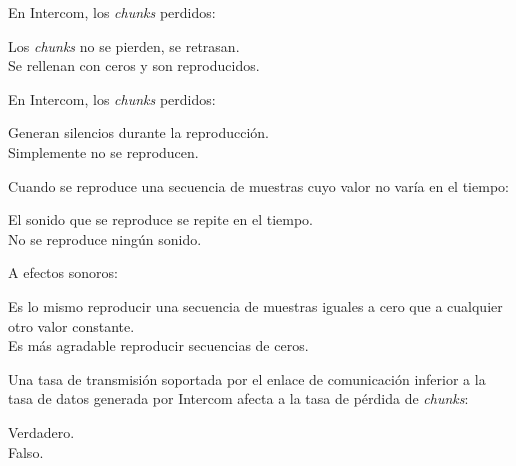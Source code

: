 \documentclass[legalpaper, 12pt, addpoints]{exam}
\begin{document}
\begin{questions}

\question En Intercom, los \emph{chunks} perdidos:

\begin{oneparchoices}
  \choice Los \emph{chunks} no se pierden, se retrasan.\\
  \choice Se rellenan con ceros y son reproducidos.
\end{oneparchoices}
  
\vspace{0.10in}

\question En Intercom, los \emph{chunks} perdidos:

\begin{oneparchoices}
  \choice Generan silencios durante la reproducción.\\
  \choice Simplemente no se reproducen.
\end{oneparchoices}
  
\vspace{0.10in}

\question Cuando se reproduce una secuencia de muestras cuyo valor no varía en el tiempo:

\begin{oneparchoices}
  \choice El sonido que se reproduce se repite en el tiempo.\\
  \choice No se reproduce ningún sonido.
\end{oneparchoices}
  
\vspace{0.10in}

\question A efectos sonoros:

\begin{oneparchoices}
  \choice Es lo mismo reproducir una secuencia de muestras iguales a cero que a cualquier otro valor constante.\\
  \choice Es más agradable reproducir secuencias de ceros.
\end{oneparchoices}
  
\vspace{0.10in}

\question Una tasa de transmisión soportada por el enlace de
comunicación inferior a la tasa de datos generada por Intercom afecta
a la tasa de pérdida de \emph{chunks}:

\begin{oneparchoices}
  \choice Verdadero.\\
  \choice Falso.
\end{oneparchoices}
  

\end{questions}
\end{document}
